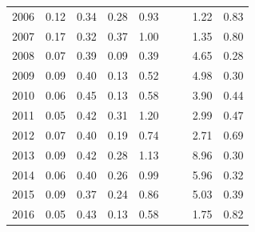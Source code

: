 \documentclass[12pt,]{article}
\begin{document}
\begin{table}[ht]
\begin{tabular}{rrrrrrrrr}
  2006 & 0.12 & 0.34 & 0.28 & 0.93 &  &  & 1.22 & 0.83 \\ 
  2007 & 0.17 & 0.32 & 0.37 & 1.00 &  &  & 1.35 & 0.80 \\ 
  2008 & 0.07 & 0.39 & 0.09 & 0.39 &  &  & 4.65 & 0.28 \\ 
  2009 & 0.09 & 0.40 & 0.13 & 0.52 &  &  & 4.98 & 0.30 \\ 
  2010 & 0.06 & 0.45 & 0.13 & 0.58 &  &  & 3.90 & 0.44 \\ 
  2011 & 0.05 & 0.42 & 0.31 & 1.20 &  &  & 2.99 & 0.47 \\ 
  2012 & 0.07 & 0.40 & 0.19 & 0.74 &  &  & 2.71 & 0.69 \\ 
  2013 & 0.09 & 0.42 & 0.28 & 1.13 &  &  & 8.96 & 0.30 \\ 
  2014 & 0.06 & 0.40 & 0.26 & 0.99 &  &  & 5.96 & 0.32 \\ 
  2015 & 0.09 & 0.37 & 0.24 & 0.86 &  &  & 5.03 & 0.39 \\ 
  2016 & 0.05 & 0.43 & 0.13 & 0.58 &  &  & 1.75 & 0.82 \\ 
   \hline
\end{tabular}
\end{table}\newpage

\FloatBarrier
\end{document}
